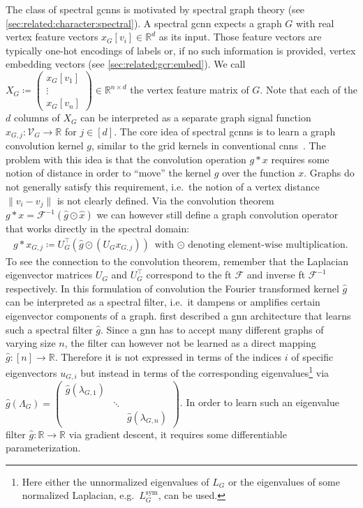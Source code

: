 The class of spectral \acp{gcnn} is motivated by spectral graph theory (see \cref{sec:related:character:spectral}).
A spectral \ac{gcnn} expects a graph $G$ with real vertex feature vectors $x_G[v_i] \in \mathbb{R}^d$ as its input.
Those feature vectors are typically one-hot encodings of labels or, if no such information is provided, vertex embedding vectors (see \cref{sec:related:gcr:embed}).
We call $X_G \coloneqq \begin{pmatrix} x_G[v_1] \\ \vdots \\ x_G[v_n] \end{pmatrix} \in \mathbb{R}^{n \times d}$ the vertex feature matrix of $G$.
Note that each of the $d$ columns of $X_G$ can be interpreted as a separate graph signal function $x_{G,j}: \mathcal{V}_G \to \mathbb{R}$ for $j \in [d]$.
The core idea of spectral \acp{gcnn} is to learn a graph convolution kernel $g$, similar to the grid kernels in conventional \acp{cnn}~\cite{LeCun1998}.
The problem with this idea is that the convolution operation $g * x$ requires some notion of distance in order to ``move'' the kernel $g$ over the function $x$.
Graphs do not generally satisfy this requirement, i.e.\ the notion of a vertex distance $\|v_i - v_j\|$ is not clearly defined.
Via the convolution theorem $g * x = \mathcal{F}^{-1}(\hat{g} \odot \hat{x})$ we can however still define a graph convolution operator that works directly in the spectral domain:
\begin{align}
	g * x_{G,j} \coloneqq U_G^{\top} (\hat{g} \odot (U_G x_{G,j}))
	\text{ with $\odot$ denoting element-wise multiplication.} \label{eq:related:graph-conv-general}
\end{align}
To see the connection to the convolution theorem, remember that the Laplacian eigenvector matrices $U_G$ and $U_G^{\top}$ correspond to the \ac{ft} $\mathcal{F}$ and inverse \ac{ft} $\mathcal{F}^{-1}$ respectively.
In this formulation of convolution the Fourier transformed kernel $\hat{g}$ can be interpreted as a spectral filter, i.e.\ it dampens or amplifies certain eigenvector components of a graph.
\citet{Bruna2013}\cite{Henaff2015} first described a \ac{gnn} architecture that learns such a spectral filter $\hat{g}$.
Since a \ac{gnn} has to accept many different graphs of varying size $n$, the filter can however not be learned as a direct mapping $\hat{g}: [n] \to \mathbb{R}$.
Therefore it is not expressed in terms of the indices $i$ of specific eigenvectors $u_{G,i}$ but instead in terms of the corresponding eigenvalues\footnote{
	Here either the unnormalized eigenvalues of $L_G$ or the eigenvalues of some normalized Laplacian, e.g.\ $L_G^{\text{sym}}$, can be used.
} via $\hat{g}(\Lambda_G) = \begin{pmatrix} \hat{g}(\lambda_{G,1}) & & \\ & \ddots & \\ & & \hat{g}(\lambda_{G,n}) \end{pmatrix}$.
In order to learn such an eigenvalue filter $\hat{g}: \mathbb{R} \to \mathbb{R}$ via gradient descent, it requires some differentiable parameterization.

